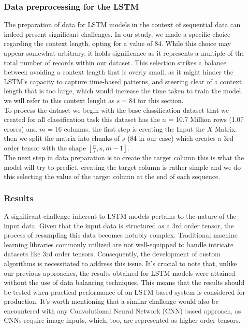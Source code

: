 \documentclass{article}
\begin{document}
\subsubsection{Data preprocessing for the LSTM}

The preparation of data for LSTM models in the context of sequential data can indeed present significant challenges. In our study, we made a specific choice regarding the context length, opting for a value of 84. While this choice may appear somewhat arbitrary, it holds significance as it represents a multiple of the total number of records within our dataset. This selection strikes a balance between avoiding a context length that is overly small, as it might hinder the LSTM's capacity to capture time-based patterns, and steering clear of a context length that is too large, which would increase the time taken to train the model. we will refer to this context lenght as $s = 84$ for this section.\\

To process the dataset we begin with the base classification dataset that we created for all classification task this dataset has the $n$ = 10.7 Million rows (1.07 crores) and $m$ = 16 columns, the first step is creating the Input the $X$ Matrix. then we split the matrix into chunks of $s$ (84 in our case) which creates a 3rd order tensor with the shape $\left[ \frac{n}{s}, s, m - 1 \right]$.\\

The next step in data preparation is to create the target column this is what the model will try to predict. creating the target column is rather simple and we do this selecting the value of the target column at the end of each sequence. 

\subsubsection{Results}

A significant challenge inherent to LSTM models pertains to the nature of the input data. Given that the input data is structured as a 3rd order tensor, the process of resampling this data becomes notably complex. Traditional machine learning libraries commonly utilized are not well-equipped to handle intricate datasets like 3rd order tensors. Consequently, the development of custom algorithms is necessitated to address this issue. It's crucial to note that, unlike our previous approaches, the results obtained for LSTM models were attained without the use of data balancing techniques. This means that the results should be tested when practical performance of an LSTM-based system is considered for production. It's worth mentioning that a similar challenge would also be encountered with any Convolutional Neural Network (CNN) based approach, as CNNs require image inputs, which, too, are represented as higher order tensors.\\
\end{document}
